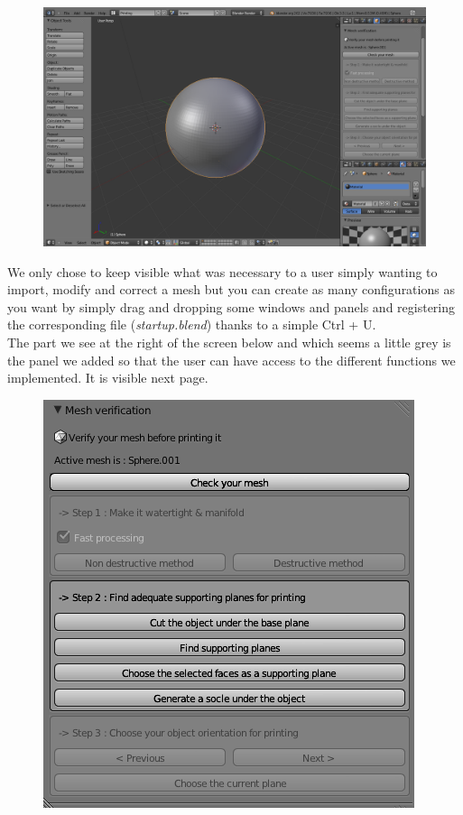 \documentclass{article}
\begin{document}
\begin{figure}[!h]
\begin{center}
	\includegraphics[scale=0.3]{./Images/NotreInterface}
\end{center}
\end{figure}

\bigskip
\bigskip

We only chose to keep visible what was necessary to a user simply wanting to import, modify and correct a mesh but you can create as many configurations as you want by simply drag and dropping some windows and panels and registering the corresponding file (\textit{startup.blend}) thanks to a simple Ctrl + U.\\

The part we see at the right of the screen below and which seems a little grey is the panel we added so that the user can have access to the different functions we implemented. It is visible next page.

\newpage

\bigskip
\begin{figure}[!h]
\begin{center}
	\includegraphics[scale=0.8]{./Images/Panel}
\end{center}
\end{figure}
\bigskip
\end{document}
